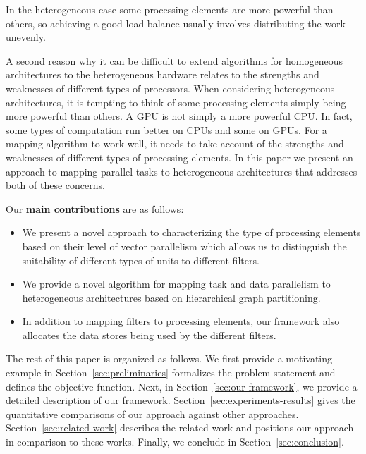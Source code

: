 In the heterogeneous case some processing elements are more powerful
than others, so achieving a good load balance usually involves
distributing the work unevenly. %

A second reason why it can be difficult to extend algorithms for
homogeneous architectures to the heterogeneous hardware relates to the
strengths and weaknesses of different types of processors. When
considering heterogeneous architectures, it is tempting to think of
some processing elements simply being more powerful than others. %
A GPU is not simply a more powerful CPU. In fact, some types of
computation run better on CPUs and some on GPUs.  For a mapping
algorithm to work well, it needs to take account of the strengths and
weaknesses of different types of processing elements. In this paper we
present an approach to mapping parallel tasks to heterogeneous
architectures that addresses both of these concerns.

Our \textbf{main contributions} are as follows:
\begin{itemize}
\item We present a novel approach to characterizing the type of
  processing elements based on their level of vector parallelism which
  allows us to distinguish the suitability of different types of units
  to different filters.
\item We provide a novel algorithm for mapping task and data parallelism
  to heterogeneous architectures based on hierarchical graph
  partitioning.
\item In addition to mapping filters to processing elements, our framework
  also allocates the data stores being used by the different filters.
\end{itemize}

The rest of this paper is organized as follows. We first provide a
motivating example in
Section~\ref{sec:preliminaries} formalizes the problem statement and
defines the objective function. Next, in
Section~\ref{sec:our-framework}, we provide a detailed description of
our framework. %
Section~\ref{sec:experiments-results} gives the quantitative
comparisons of our approach against other
approaches. Section~\ref{sec:related-work} describes the related work
and positions our approach in comparison to these works.  Finally, we
conclude in Section~\ref{sec:conclusion}.

